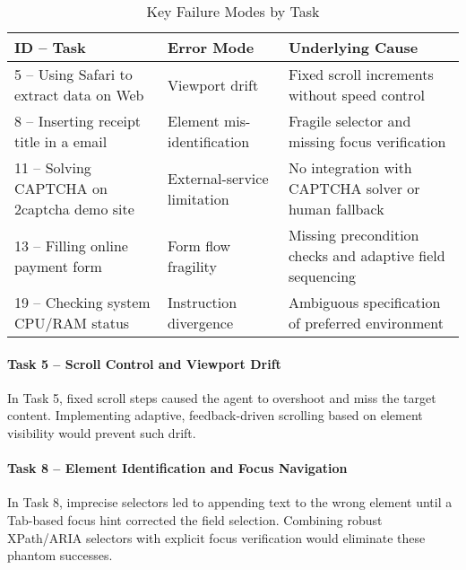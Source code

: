 \documentclass[runningheads]{llncs}
\begin{document}
\begin{table}[H]
  \centering
  \renewcommand{\arraystretch}{1.5}
  \setlength{\tabcolsep}{8pt}
  \caption{Key Failure Modes by Task}
  \label{tab:error_summary}
  \begin{tabular}{p{4cm} p{4cm} p{4cm}}
    \toprule
    \textbf{ID – Task}                              & \textbf{Error Mode}            & \textbf{Underlying Cause}                                 \\
    \midrule
    5 – Using Safari to extract data on Web         & Viewport drift                 & Fixed scroll increments without speed control             \\[6pt]
    8 – Inserting receipt title in a email           & Element mis-identification     & Fragile selector and missing focus verification           \\[6pt]
    11 – Solving CAPTCHA on 2captcha demo site      & External-service limitation    & No integration with CAPTCHA solver or human fallback      \\[6pt]
    13 – Filling online payment form                & Form flow fragility            & Missing precondition checks and adaptive field sequencing \\[6pt]
    19 – Checking system CPU/RAM status             & Instruction divergence         & Ambiguous specification of preferred environment          \\
    \bottomrule
  \end{tabular}
\end{table}



\paragraph{Task 5 – Scroll Control and Viewport Drift}  
In Task 5, fixed scroll steps caused the agent to overshoot and miss the target content. Implementing adaptive, feedback-driven scrolling based on element visibility would prevent such drift.

\paragraph{Task 8 – Element Identification and Focus Navigation}  
In Task 8, imprecise selectors led to appending text to the wrong element until a Tab-based focus hint corrected the field selection. Combining robust XPath/ARIA selectors with explicit focus verification would eliminate these phantom successes.
\end{document}
